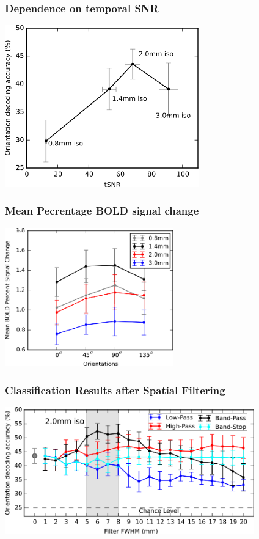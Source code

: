 \documentclass{beamer}
\begin{document}
  \begin{frame}
    \frametitle{Dependence on temporal SNR}
        \begin{center}
            \includegraphics[height=7cm]{pics/tSNR_vs_accuracy}
        \end{center}
    \end{frame}    

  \begin{frame}
    \frametitle{Mean Pecrentage BOLD signal change}
        \begin{center}
            \includegraphics[height=6cm]{pics/signal_change}
        \end{center}
    \end{frame} 


  \begin{frame}
    \frametitle{Classification Results after Spatial Filtering}
        \begin{center}
            \includegraphics[height=5.5cm]{pics/spatial_smoothing}
        \end{center}
    \end{frame} 
\end{document}
